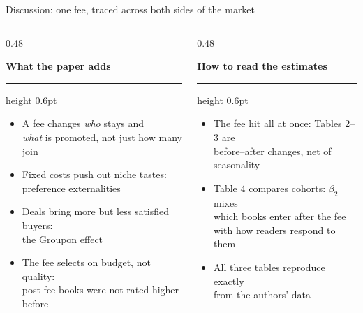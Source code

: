 \documentclass[aspectratio=169, 11pt, t, usepdftitle=false]{beamer}
\newcommand{\colhead}[1]{%
  {\small\bfseries\color{UniBlue}#1\strut\par}\vspace{0.15em}%
  {\color{DividerGray}\hrule height 0.6pt}\vspace{0.1em}}
\begin{document}
\begin{frame}{Discussion: one fee, traced across both sides of the market}
  \vspace{0.5em}
  \begin{columns}[T,onlytextwidth]
    \begin{column}{0.48\textwidth}
      \colhead{What the paper adds}
        \footnotesize
        \begin{itemize}
          \item A fee changes \emph{who} stays and\\
            \emph{what} is promoted, not just how many join\\
            \parencite{rochet2003platform,armstrong2006competition}
          \item Fixed costs push out niche tastes:\\
            preference externalities \parencite{waldfogel2003preference}
          \item Deals bring more but less satisfied buyers:\\
            the Groupon effect \parencite{byers2012groupon}
          \item The fee selects on budget, not quality:\\
            post-fee books were not rated higher before
        \end{itemize}
    \end{column}
    \begin{column}{0.48\textwidth}
      \colhead{How to read the estimates}
        \footnotesize
        \begin{itemize}
          \item The fee hit all at once: Tables 2--3 are\\
            before--after changes, net of seasonality
          \item Table 4 compares cohorts: $\beta_2$ mixes\\
            which books enter after the fee\\
            with how readers respond to them
          \item All three tables reproduce exactly\\
            from the authors' data
        \end{itemize}
    \end{column}
  \end{columns}

\end{frame}

\WhartonEndFrame

\appendix
\end{document}
